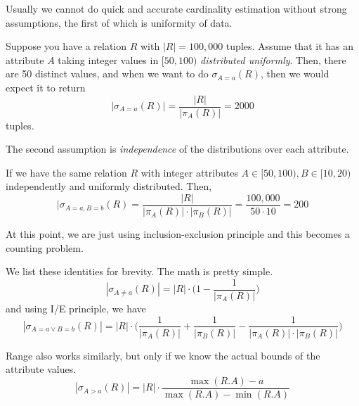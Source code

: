 \documentclass{article}
\begin{document}
      Usually we cannot do quick and accurate cardinality estimation without strong assumptions, the first of which is uniformity of data. 

      \begin{example}
        Suppose you have a relation $R$ with $|R| = 100,000$ tuples. Assume that it has an attribute $A$ taking integer values in $[50, 100)$ \textit{distributed uniformly}. Then, there are 50 distinct values, and when we want to do $\sigma_{A = a} (R)$, then we would expect it to return 
        \begin{equation}
          |\sigma_{A = a} (R)| = \frac{|R|}{|\pi_A(R)|} = 2000
        \end{equation}
        tuples.
      \end{example}

      The second assumption is \textit{independence} of the distributions over each attribute. 

      \begin{example}
        If we have the same relation $R$ with integer attributes $A \in [50, 100), B \in [10, 20)$ independently and uniformly distributed. Then, 
        \begin{equation}
          |\sigma_{A = a, B = b} (R) = \frac{|R|}{|\pi_A (R)| \cdot |\pi_B(R)|} = \frac{100,000}{50 \cdot 10} = 200
        \end{equation}
      \end{example}

      At this point, we are just using inclusion-exclusion principle and this becomes a counting problem. 

      \begin{example}
        We list these identities for brevity. The math is pretty simple. 
        \begin{equation}
          |\sigma_{A \neq a} (R)| = |R| \cdot \bigg( 1 - \frac{1}{|\pi_A (R)|} \bigg)
        \end{equation}
        and using I/E principle, we have 
        \begin{equation}
          |\sigma_{A = a \lor B = b} (R)| = |R| \cdot \bigg( \frac{1}{|\pi_A (R)|}  + \frac{1}{|\pi_B (R)|} - \frac{1}{|\pi_A (R)| \cdot |\pi_B(R)|} \bigg)
        \end{equation}
      \end{example}

      \begin{example}
        Range also works similarly, but only if we know the actual bounds of the attribute values.  
        \begin{equation}
          |\sigma_{A > a} (R)| = |R| \cdot \frac{\max(R.A) - a}{\max(R.A) - \min(R.A)}
        \end{equation}
      \end{example}
\end{document}
